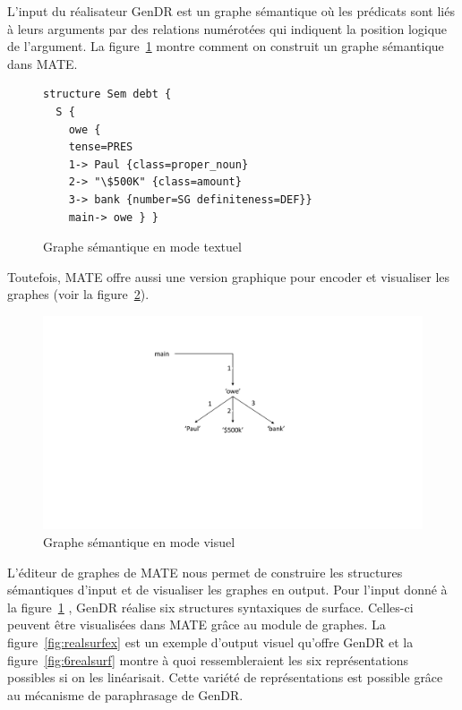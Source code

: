 L'input du réalisateur GenDR est un graphe sémantique \citep{mel2012semantics} où les prédicats sont liés à leurs arguments par des relations numérotées qui indiquent la position logique de l'argument. La figure~\ref{fig:debt} montre comment on construit un graphe sémantique dans MATE.

\begin{figure}
  \caption{Graphe sémantique en mode textuel}
	\label{fig:debt}
\begin{lstlisting}[language=mate]
structure Sem debt {
  S {
    owe {
    tense=PRES
    1-> Paul {class=proper_noun}
    2-> "\$500K" {class=amount}
    3-> bank {number=SG definiteness=DEF}}
    main-> owe } }
\end{lstlisting}
\end{figure}

Toutefois, MATE offre aussi une version graphique pour encoder et visualiser les graphes (voir la figure~\ref{fig:graphesem}).

\begin{figure}[htb]
	\centering
	\includegraphics[width=1\textwidth, trim = {0cm 8.3cm 0cm 3cm},clip]{ch3/figs/owe_sem.pdf}
	\caption{Graphe sémantique en mode visuel}
	\label{fig:graphesem}
\end{figure}

L'éditeur de graphes de MATE nous permet de construire les structures sémantiques d'input et de visualiser les graphes en output. Pour l'input donné à la figure~\ref{fig:debt} , GenDR réalise six structures syntaxiques de surface. Celles-ci peuvent être visualisées dans MATE grâce au module de graphes. La figure~\ref{fig:realsurfex} est un exemple d'output visuel qu'offre GenDR et la figure~\ref{fig:6realsurf} montre à quoi ressembleraient les six représentations possibles si on les linéarisait. Cette variété de représentations est possible grâce au mécanisme de paraphrasage de GenDR.

